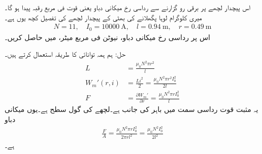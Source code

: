 اس پیچدار لچھے پر  برقی رو  گزارنے سے رداسی رخ میکانی دباو یعنی قوت فی مربع رقبہ پیدا ہو گا۔میری  کلوگرام لوہا پگھلانے کی بھٹی کے پیچدار لچھے کی تفصیل کچھ یوں ہے۔
\begin{align*}
N=11, \quad I_0=\SI{10000}{\ampere}, \quad l=\SI{0.94}{\meter}, \quad r=\SI{0.49}{\meter}
\end{align*}
اس پر رداسی رخ میکانی دباو، نیوٹن فی مربع میٹر، میں حاصل کریں۔


حل:\quad 
ہم ہمہ توانائی کا طریقہ استعمال کرتے ہیں۔
\begin{align*}
L&=\frac{\mu_0 N^2 \pi r^2}{l}\\
W_m'(r,i)&=\frac{L i^2}{2}=\frac{\mu_0 N^2 \pi r^2 I_0^2}{2 l}\\
F&=\frac{\partial W_m'}{\partial r}=\frac{\mu_0 N^2 \pi r I_0^2}{l}
\end{align*}
یہ مثبت قوت رداسی سمت میں باہر کی جانب ہے۔لچھے کی گول سطح   ہے۔یوں میکانی دباو
\begin{align*}
\frac{F}{A}=\frac{\mu_0 N^2 \pi r I_0^2}{2\pi r l^2}=\frac{\mu_0 N^2  I_0^2}{2 l^2}
\end{align*}
ہے۔

